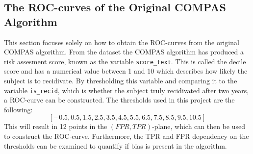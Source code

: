 \documentclass[11pt, fleqn, titlepage]{article}
\begin{document}
	\subsection{The ROC-curves of the Original COMPAS Algorithm}
	
	This section focuses solely on how to obtain the ROC-curves from the original COMPAS algorithm. From the dataset the COMPAS algorithm has produced a risk assesment score, known as the variable \texttt{score\_text}. This is called the decile score and has a numerical value between 1 and 10 which describes how likely the subject is to recidivate. By thresholding this variable and comparing it to the variable \texttt{is\_recid}, which is whether the subject truly recidivated after two years, a ROC-curve can be constructed. The thresholds used in this project are the following: 
	\[ [-0.5,  0.5,  1.5, 2.5,  3.5,  4.5, 5.5,  6.5,  7.5,  8.5,  9.5, 10.5] \]
	This will result in 12 points in the $ (FPR,TPR) $-plane, which can then be used to construct the ROC-curve. Furthermore, the TPR and FPR dependency on the thresholds can be examined to quantify if bias is present in the algorithm.
	
	
\end{document}
